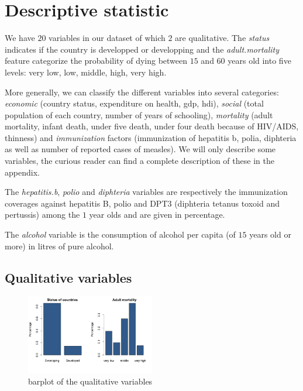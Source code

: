 \section{Descriptive statistic}

We have $20$ variables in our dataset of which $2$ are qualitative. The \textit{status} indicates if the country is developped or developping and the \textit{adult.mortality} feature categorize the probability of dying between $15$ and $60$ years old into five levels: very low, low, middle, high, very high. 

More generally, we can classify the different variables into several categories: \textit{economic} (country status, expenditure on health, gdp, hdi), \textit{social} (total population of each country, number of years of schooling), \textit{mortality} (adult mortality, infant death, under five death, under four death because of HIV/AIDS, thinness) and \textit{immunization} factors (immunization of hepatitis b, polia, diphteria as well as number of reported cases of measles). We will only describe some variables, the curious reader can find a complete description of these in the appendix.

The \textit{hepatitis.b}, \textit{polio} and \textit{diphteria} variables are respectively the immunization coverages against hepatitis B, polio and DPT3 (diphteria tetanus toxoid and pertussis) among the $1$ year olds and are given in percentage.

The \textit{alcohol} variable is the consumption of alcohol per capita (of $15$ years old or more) in litres of pure alcohol.

\subsection{Qualitative variables}

\begin{figure}[H]
	\centering
	\includegraphics[width=0.5\textwidth]{figures/eda/histogram_qualitative_variables.png}
	\caption{barplot of the qualitative variables}
	\label{fig:qualitative_variables_barplot}
\end{figure}

